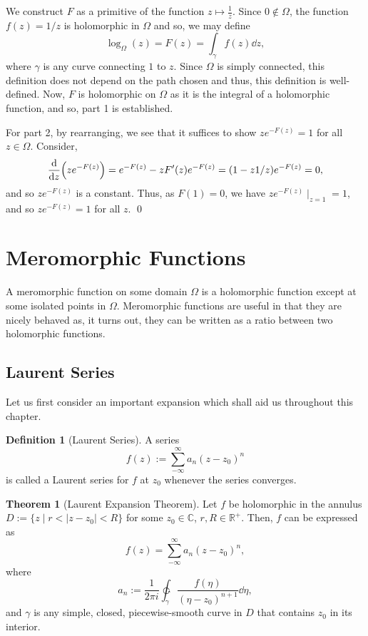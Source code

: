 \documentclass[
]{article}
\theoremstyle{definition}
\newtheorem{theorem}{Theorem}
\theoremstyle{definition}
\newtheorem{definition}{Definition}[section]
\begin{document}
\proof

We construct \(F\) as a primitive of the function
\(z \mapsto \frac{1}{z}\). Since \(0 \not\in \Omega\), the function
\(f(z) = 1 / z\) is holomorphic in \(\Omega\) and so, we may define
\[\log_\Omega(z) = F(z) = \int_\gamma f(z) \dd z,\] where \(\gamma\) is
any curve connecting \(1\) to \(z\). Since \(\Omega\) is simply
connected, this definition does not depend on the path chosen and thus,
this definition is well-defined. Now, \(F\) is holomorphic on \(\Omega\)
as it is the integral of a holomorphic function, and so, part 1 is
established.

For part 2, by rearranging, we see that it suffices to show
\(ze^{-F(z)} = 1\) for all \(z \in \Omega\). Consider,
\[\dv{z}(ze^{-F(z)}) = e^{-F(z)} - z F'(z)e^{-F(z)} = 
    (1 - z 1 / z) e^{-F(z)} = 0,\] and so \(ze^{-F(z)}\) is a constant.
Thus, as \(F(1) = 0\), we have \(ze^{-F(z)}\mid_{z = 1} = 1\), and so
\(ze^{-F(z)} = 1\) for all \(z\). \qed

\newpage

\hypertarget{meromorphic-functions}{%
\section{Meromorphic Functions}\label{meromorphic-functions}}

A meromorphic function on some domain \(\Omega\) is a holomorphic
function except at some isolated points in \(\Omega\). Meromorphic
functions are useful in that they are nicely behaved as, it turns out,
they can be written as a ratio between two holomorphic functions.

\hypertarget{laurent-series}{%
\subsection{Laurent Series}\label{laurent-series}}

Let us first consider an important expansion which shall aid us
throughout this chapter.

\begin{definition}[Laurent Series]
  A series 
  \[f(z) := \sum_{-\infty}^\infty a_n(z - z_0)^n\]
  is called a Laurent series for \(f\) at \(z_0\) whenever the series converges.
\end{definition}

\begin{theorem}[Laurent Expansion Theorem]
  Let \(f\) be holomorphic in the annulus \(D := \{z \mid r < |z - z_0| < R\}\) 
  for some \(z_0 \in \mathbb{C}\), \(r, R \in \mathbb{R}^+\). Then, \(f\) 
  can be expressed as 
  \[f(z) = \sum_{-\infty}^\infty a_n(z - z_0)^n,\]
  where
  \[a_n := \frac{1}{2\pi i} \ointctrclockwise_\gamma 
    \frac{f(\eta)}{(\eta - z_0)^{n + 1}} \dd \eta,\]
  and \(\gamma\) is any simple, closed, piecewise-smooth curve in \(D\) that 
  contains \(z_0\) in its interior.
\end{theorem}
\end{document}
